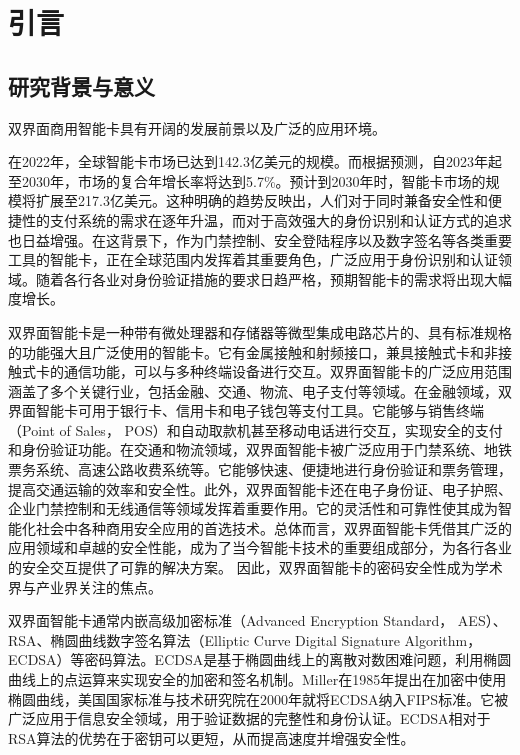 \chapter{引言}\label{chap:introduction}{
	\section{研究背景与意义}
	双界面商用智能卡具有开阔的发展前景以及广泛的应用环境。
	
	在2022年，全球智能卡市场已达到142.3亿美元的规模。而根据预测，自2023年起至2030年，市场的复合年增长率将达到5.7\%\citep{GVR-1-68038-464-2}。预计到2030年时，智能卡市场的规模将扩展至217.3亿美元。这种明确的趋势反映出，人们对于同时兼备安全性和便捷性的支付系统的需求在逐年升温，而对于高效强大的身份识别和认证方式的追求也日益增强。在这背景下，作为门禁控制、安全登陆程序以及数字签名等各类重要工具的智能卡，正在全球范围内发挥着其重要角色，广泛应用于身份识别和认证领域。随着各行各业对身份验证措施的要求日趋严格，预期智能卡的需求将出现大幅度增长。
	
	双界面智能卡是一种带有微处理器和存储器等微型集成电路芯片的、具有标准规格的功能强大且广泛使用的智能卡。它有金属接触和射频接口，兼具接触式卡和非接触式卡的通信功能，可以与多种终端设备进行交互。双界面智能卡的广泛应用范围涵盖了多个关键行业，包括金融、交通、物流、电子支付等领域。在金融领域，双界面智能卡可用于银行卡、信用卡和电子钱包等支付工具。它能够与销售终端（Point of Sales， POS）和自动取款机甚至移动电话进行交互，实现安全的支付和身份验证功能。在交通和物流领域，双界面智能卡被广泛应用于门禁系统、地铁票务系统、高速公路收费系统等。它能够快速、便捷地进行身份验证和票务管理，提高交通运输的效率和安全性。此外，双界面智能卡还在电子身份证、电子护照、企业门禁控制和无线通信等领域发挥着重要作用。它的灵活性和可靠性使其成为智能化社会中各种商用安全应用的首选技术。总体而言，双界面智能卡凭借其广泛的应用领域和卓越的安全性能，成为了当今智能卡技术的重要组成部分，为各行各业的安全交互提供了可靠的解决方案。
	因此，双界面智能卡的密码安全性成为学术界与产业界关注的焦点。
	
	双界面智能卡通常内嵌高级加密标准（Advanced Encryption Standard， AES）、RSA、椭圆曲线数字签名算法（Elliptic Curve Digital Signature Algorithm， ECDSA）等密码算法。ECDSA是基于椭圆曲线上的离散对数困难问题，利用椭圆曲线上的点运算来实现安全的加密和签名机制。Miller\citep{Miller85}在1985年提出在加密中使用椭圆曲线，美国国家标准与技术研究院在2000年就将ECDSA纳入FIPS标准\citep{FIPS186-2}。它被广泛应用于信息安全领域，用于验证数据的完整性和身份认证。ECDSA相对于RSA算法的优势在于密钥可以更短，从而提高速度并增强安全性。
	
}
